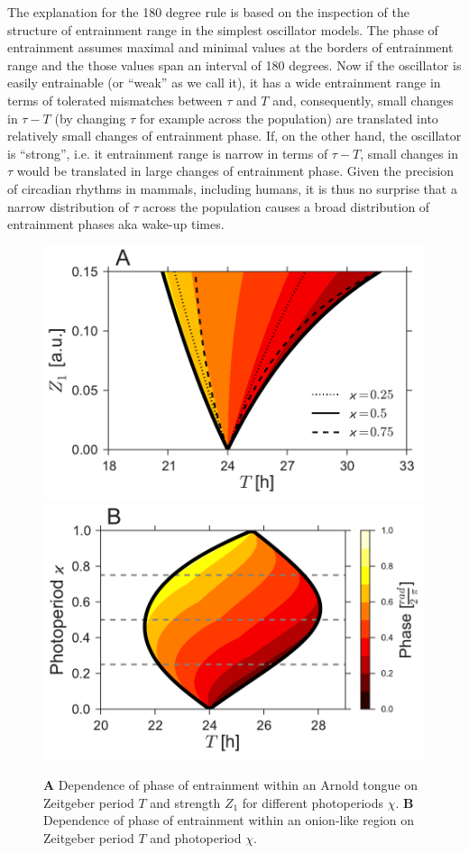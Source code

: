 The explanation for the 180 degree rule is based on the inspection of
the structure of entrainment range in the simplest oscillator models.
The phase of entrainment assumes maximal and minimal values at the
borders of entrainment range and the those values span an interval of
180 degrees. Now if the oscillator is easily entrainable (or ``weak''
as we call it), it has a wide entrainment range in terms of tolerated
mismatches between $\tau$ and $T$ and, consequently, small changes in
$\tau-T$ (by changing $\tau$ for example across the population) are
translated into relatively small changes of entrainment phase. If, on
the other hand, the oscillator is ``strong'', i.e. it entrainment
range is narrow in terms of $\tau-T$, small changes in $\tau$ would be
translated in large changes of entrainment phase. Given the precision
of circadian rhythms in mammals, including humans, it is thus no
surprise that a narrow distribution of $\tau$ across the population
causes a broad distribution of entrainment phases aka wake-up times.

\begin{figure}
\begin{center}
\includegraphics[width=0.49\linewidth]{figures/phase/fig1A.pdf}
\includegraphics[width=0.49\linewidth]{figures/phase/fig1B.pdf}
\end{center}
\caption{
  {\bf A} Dependence of phase of entrainment within an Arnold tongue
  on Zeitgeber period $T$ and strength $Z_1$ for different
  photoperiods $\chi$.
  {\bf B} Dependence of phase of entrainment within an onion-like
  region on Zeitgeber period $T$ and photoperiod $\chi$.
\label{fig::phase}
}
\end{figure}

